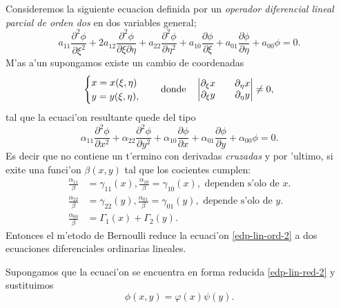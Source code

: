 \documentclass[main.tex]{subfiles}
\begin{document}
\begin{teorema}
  Consideremos la siguiente ecuacion definida por un \emph{operador diferencial lineal parcial de orden dos} en dos variables general;
  \begin{equation}\label{edp-lin-ord-2}
    a_{11}\dfrac{\partial^{2}\phi}{\partial\xi^{2}}+2a_{12}\dfrac{\partial^{2}\phi}{\partial\xi\partial\eta}+
    a_{22}\dfrac{\partial^{2}\phi}{\partial\eta^{2}}+a_{10}\dfrac{\partial\phi}{\partial\xi}+
    a_{01}\dfrac{\partial\phi}{\partial\eta}+a_{00}\phi=0.
  \end{equation}
  M'as a'un supongamos existe un cambio de coordenadas
\begin{equation}
  \begin{cases}
    x=x(\xi,\eta)\\
    y=y(\xi,\eta),
  \end{cases}
    \quad\text{donde}\quad
    \begin{vmatrix}
      \partial_{\xi}x && \partial_{\eta}x\\
      \partial_{\xi}y && \partial_{\eta}y
    \end{vmatrix}\neq0,\\
  \end{equation}
  tal que la ecuaci'on resultante quede del tipo
  \begin{equation}\label{edp-lin-red-2}
    \alpha_{11}\dfrac{\partial^{2}\phi}{\partial x^{2}}+\alpha_{22}\dfrac{\partial^{2}\phi}{\partial y^{2}}
    +\alpha_{10}\dfrac{\partial\phi}{\partial x}+\alpha_{01}\dfrac{\partial\phi}{\partial y}+\alpha_{00}\phi=0.
  \end{equation}
  Es decir que no contiene un t'ermino con derivadas \emph{cruzadas} y por 'ultimo, si exite una funci'on $\beta(x,y)$ tal que los cocientes cumplen:
  \begin{align*}
    \frac{\alpha_{11}}{\beta}&=\gamma_{11}(x),\frac{\alpha_{10}}{\beta}=\gamma_{10}(x),\text{ dependen s'olo de }x.\\
    \frac{\alpha_{22}}{\beta}&=\gamma_{22}(y),\frac{\alpha_{01}}{\beta}=\gamma_{01}(y),\text{ depende s'olo de }y.\\
    \frac{\alpha_{00}}{\beta}&=\Gamma_{1}(x)+\Gamma_{2}(y).
  \end{align*}
  Entonces el m'etodo de Bernoulli reduce la ecuaci'on \ref{edp-lin-ord-2} a dos ecuaciones diferenciales ordinarias lineales.
  \end{teorema}
  \dem Supongamos que la ecuaci'on se encuentra en forma reducida \ref{edp-lin-red-2} y sustituimos
  \[
    \phi(x,y)=\varphi(x)\psi(y).
  \]
\end{document}
